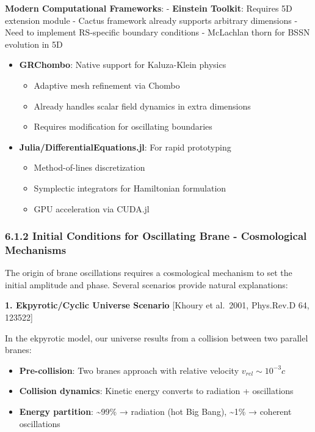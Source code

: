 \documentclass[
  11pt,
]{report}
\providecommand{\tightlist}{%
  \setlength{\itemsep}{0pt}\setlength{\parskip}{0pt}}
\begin{document}
\textbf{Modern Computational Frameworks}: - \textbf{Einstein Toolkit}:
Requires 5D extension module - Cactus framework already supports
arbitrary dimensions - Need to implement RS-specific boundary conditions
- McLachlan thorn for BSSN evolution in 5D

\begin{itemize}
\tightlist
\item
  \textbf{GRChombo}: Native support for Kaluza-Klein physics

  \begin{itemize}
  \tightlist
  \item
    Adaptive mesh refinement via Chombo
  \item
    Already handles scalar field dynamics in extra dimensions
  \item
    Requires modification for oscillating boundaries
  \end{itemize}
\item
  \textbf{Julia/DifferentialEquations.jl}: For rapid prototyping

  \begin{itemize}
  \tightlist
  \item
    Method-of-lines discretization
  \item
    Symplectic integrators for Hamiltonian formulation
  \item
    GPU acceleration via CUDA.jl
  \end{itemize}
\end{itemize}

\subsubsection{6.1.2 Initial Conditions for Oscillating Brane -
Cosmological
Mechanisms}\label{initial-conditions-for-oscillating-brane---cosmological-mechanisms}

The origin of brane oscillations requires a cosmological mechanism to
set the initial amplitude and phase. Several scenarios provide natural
explanations:

\textbf{1. Ekpyrotic/Cyclic Universe Scenario} {[}Khoury et al.~2001,
Phys.Rev.D 64, 123522{]}

In the ekpyrotic model, our universe results from a collision between
two parallel branes:

\begin{itemize}
\tightlist
\item
  \textbf{Pre-collision}: Two branes approach with relative velocity
  \(v_{rel} \sim 10^{-3}c\)
\item
  \textbf{Collision dynamics}: Kinetic energy converts to radiation +
  oscillations
\item
  \textbf{Energy partition}: \textasciitilde99\% → radiation (hot Big
  Bang), \textasciitilde1\% → coherent oscillations
\end{itemize}
\end{document}
